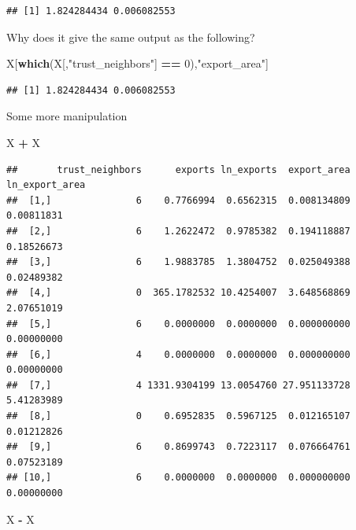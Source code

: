 \documentclass[]{book}
\newenvironment{Shaded}{\begin{snugshade}}{\end{snugshade}}
\newcommand{\KeywordTok}[1]{\textcolor[rgb]{0.13,0.29,0.53}{\textbf{#1}}}
\newcommand{\DecValTok}[1]{\textcolor[rgb]{0.00,0.00,0.81}{#1}}
\newcommand{\StringTok}[1]{\textcolor[rgb]{0.31,0.60,0.02}{#1}}
\newcommand{\OperatorTok}[1]{\textcolor[rgb]{0.81,0.36,0.00}{\textbf{#1}}}
\newcommand{\NormalTok}[1]{#1}
\theoremstyle{definition}
\theoremstyle{definition}
\theoremstyle{definition}
\theoremstyle{remark}
\begin{document}
\begin{verbatim}
## [1] 1.824284434 0.006082553
\end{verbatim}

Why does it give the same output as the following?

\begin{Shaded}
\begin{Highlighting}[]
\NormalTok{X[}\KeywordTok{which}\NormalTok{(X[,}\StringTok{"trust_neighbors"}\NormalTok{] }\OperatorTok{==}\StringTok{ }\DecValTok{0}\NormalTok{),}\StringTok{"export_area"}\NormalTok{]}
\end{Highlighting}
\end{Shaded}

\begin{verbatim}
## [1] 1.824284434 0.006082553
\end{verbatim}

Some more manipulation

\begin{Shaded}
\begin{Highlighting}[]
\NormalTok{X }\OperatorTok{+}\StringTok{ }\NormalTok{X}
\end{Highlighting}
\end{Shaded}

\begin{verbatim}
##       trust_neighbors      exports ln_exports  export_area ln_export_area
##  [1,]               6    0.7766994  0.6562315  0.008134809     0.00811831
##  [2,]               6    1.2622472  0.9785382  0.194118887     0.18526673
##  [3,]               6    1.9883785  1.3804752  0.025049388     0.02489382
##  [4,]               0  365.1782532 10.4254007  3.648568869     2.07651019
##  [5,]               6    0.0000000  0.0000000  0.000000000     0.00000000
##  [6,]               4    0.0000000  0.0000000  0.000000000     0.00000000
##  [7,]               4 1331.9304199 13.0054760 27.951133728     5.41283989
##  [8,]               0    0.6952835  0.5967125  0.012165107     0.01212826
##  [9,]               6    0.8699743  0.7223117  0.076664761     0.07523189
## [10,]               6    0.0000000  0.0000000  0.000000000     0.00000000
\end{verbatim}

\begin{Shaded}
\begin{Highlighting}[]
\NormalTok{X }\OperatorTok{-}\StringTok{ }\NormalTok{X}
\end{Highlighting}
\end{Shaded}
\end{document}
